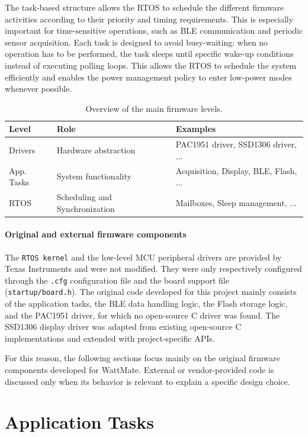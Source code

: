The task-based structure allows the RTOS to schedule the different firmware activities according to their priority and timing requirements. This is especially important for time-sensitive operations, such as BLE communication and periodic sensor acquisition. Each task is designed to avoid busy-waiting: when no operation has to be performed, the task sleeps until specific wake-up conditions instead of executing polling loops. This allows the RTOS to schedule the system efficiently and enables the power management policy to enter low-power modes whenever possible.

\begin{table}[H]
	\centering
	\caption{Overview of the main firmware levels.}
	\label{tab:firmware_levels}
	\begin{tabular}{lll}
		\toprule
		\textbf{Level} & \textbf{Role} & \textbf{Examples} \\
		\midrule
		Drivers & Hardware abstraction & PAC1951 driver, SSD1306 driver, ... \\
		App. Tasks & System functionality & Acquisition, Display, BLE, Flash, ... \\
		RTOS & Scheduling and Synchronization & Mailboxes, Sleep management, ... \\
		\bottomrule
	\end{tabular}
\end{table}

\paragraph{Original and external firmware components}
The \texttt{RTOS kernel} and the low-level MCU peripheral drivers are provided by Texas Instruments and were not modified. They were only respectively configured through the \texttt{.cfg} configuration file and the board support file (\texttt{startup/board.h}). The original code developed for this project mainly consists of the application tasks, the BLE data handling logic, the Flash storage logic, and the PAC1951 driver, for which no open-source C driver was found. The SSD1306 display driver was adapted from existing open-source C implementations and extended with project-specific APIs.

For this reason, the following sections focus mainly on the original firmware components developed for WattMate. External or vendor-provided code is discussed only when its behavior is relevant to explain a specific design choice.

\section{Application Tasks}

